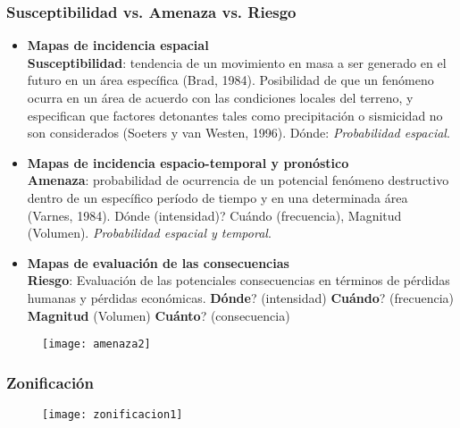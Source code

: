 \documentclass[12pt]{beamer}
\begin{document}
\begin{frame}
\frametitle{Susceptibilidad vs. Amenaza vs. Riesgo}
\scriptsize{
\begin{itemize}
\item \textbf{Mapas de incidencia espacial}\\
\textbf{Susceptibilidad}: tendencia de un movimiento en masa a ser generado en el futuro en un área específica (Brad, 1984). Posibilidad de que un fenómeno ocurra en un área de acuerdo con las condiciones locales del terreno, y especifican que factores detonantes tales como precipitación o sismicidad no son considerados (Soeters y van Westen, 1996).  Dónde: \emph{Probabilidad espacial}.
\item \textbf{Mapas de incidencia espacio-temporal y pronóstico}\\
\textbf{Amenaza}: probabilidad de ocurrencia de un potencial fenómeno destructivo dentro de un específico período de tiempo y en una determinada área (Varnes, 1984). Dónde (intensidad)? Cuándo (frecuencia), Magnitud (Volumen). \emph{Probabilidad espacial y temporal}.
\item \textbf{Mapas de evaluación de las consecuencias}\\
\textbf{Riesgo}: Evaluación de las potenciales consecuencias en términos de pérdidas humanas y pérdidas económicas. \textbf{Dónde}? (intensidad) \textbf{Cuándo}? (frecuencia) \textbf{Magnitud} (Volumen) \textbf{Cuánto}? (consecuencia)
\end{itemize}
}
\begin{figure}
\centering
\texttt{[image: amenaza2]} 
\end{figure}
\end{frame}
\begin{frame}
\frametitle{Zonificación}
\begin{figure}
\centering
\texttt{[image: zonificacion1]} 
\end{figure}
\end{frame}
\end{document}
